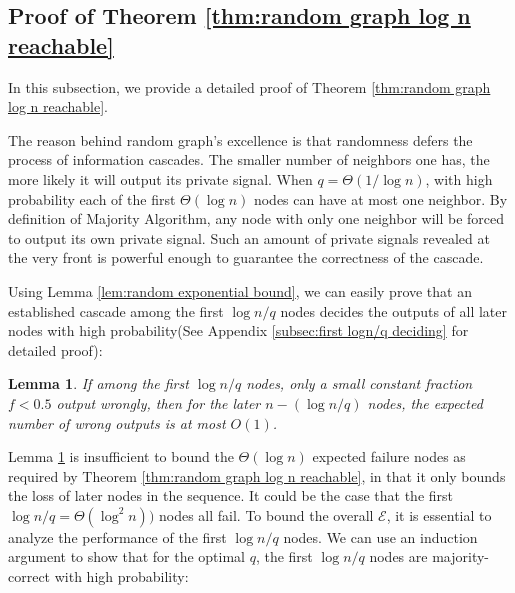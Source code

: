 \documentclass[a4paper,UKenglish]{lipics}
\newtheorem{lem}[thm]{Lemma}
\theoremstyle{definition}
\begin{document}
\subsection {Proof of Theorem \ref{thm:random graph log n reachable}}

In this subsection, we provide a detailed proof of Theorem \ref{thm:random graph log n reachable}.

The reason behind random graph's excellence is that randomness defers the process of information cascades.
The smaller number of neighbors one has, the more likely it will output its private signal.
When $q = \Theta(1/ \log n)$, with high probability each of the first $\Theta(\log n)$ nodes can have at most one neighbor.
By definition of Majority Algorithm, any node with only one neighbor will be forced to output its own private signal.
Such an amount of private signals revealed at the very front is powerful enough to guarantee the correctness of the cascade.


Using Lemma \ref{lem:random exponential bound}, we can easily prove that an established cascade among the first $\log n / q$ nodes decides the outputs of all later nodes with high probability(See Appendix \ref{subsec:first logn/q deciding} for detailed proof):
\begin{lem} \label {lem:first logn/q deciding}
If among the first $\log n/q$ nodes, 
	only a small constant fraction $f < 0.5$ output wrongly, 
	then for the later $n - (\log n/q)$ nodes, the expected number of wrong outputs is at most $O(1)$.
\end{lem}


Lemma \ref{lem:first logn/q deciding} is insufficient to bound the $\Theta(\log n)$ expected failure nodes as required by Theorem \ref{thm:random graph log n reachable},
	in that it only bounds the loss of later nodes in the sequence. It could be the case that the first $\log n/q = \Theta(\log^2 n))$ nodes all fail.
To bound the overall $\mathcal{E}$, it is essential to analyze the performance of the first $\log n/q$ nodes.
We can use an induction argument to show that for the optimal $q$, the first $\log n/q$ nodes are majority-correct with high probability:
\end{document}
